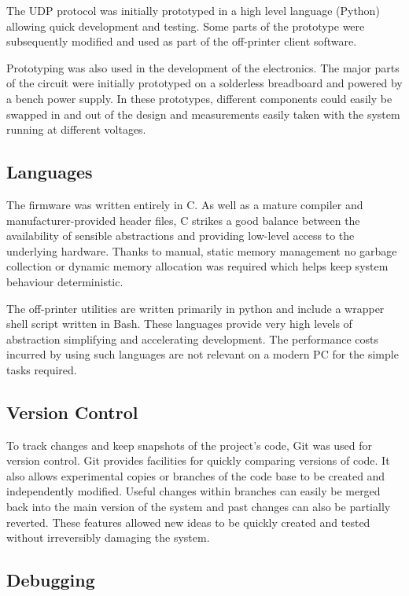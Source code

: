 			The UDP protocol was initially prototyped in a high level language
			(Python) allowing quick development and testing. Some parts of the
			prototype were subsequently modified and used as part of the off-printer
			client software.
			
			Prototyping was also used in the development of the electronics. The major
			parts of the circuit were initially prototyped on a solderless breadboard
			and powered by a bench power supply. In these prototypes, different
			components could easily be swapped in and out of the design and
			measurements easily taken with the system running at different voltages.
		
		\subsection{Languages}
			
			The firmware was written entirely in C. As well as a mature compiler and
			manufacturer-provided header files, C strikes a good balance between the
			availability of sensible abstractions and providing low-level access to
			the underlying hardware. Thanks to manual, static memory management no
			garbage collection or dynamic memory allocation was required which helps
			keep system behaviour deterministic.
			
			The off-printer utilities are written primarily in python and include a
			wrapper shell script written in Bash. These languages provide very high
			levels of abstraction simplifying and accelerating development. The
			performance costs incurred by using such languages are not relevant on a
			modern PC for the simple tasks required.
			
		\subsection{Version Control}
			
			To track changes and keep snapshots of the project's code, Git was used
			for version control. Git provides facilities for quickly comparing
			versions of code. It also allows experimental copies or branches of the
			code base to be created and independently modified. Useful changes within
			branches can easily be merged back into the main version of the system and
			past changes can also be partially reverted. These features allowed new
			ideas to be quickly created and tested without irreversibly damaging the
			system.
		
		\subsection{Debugging}
			

